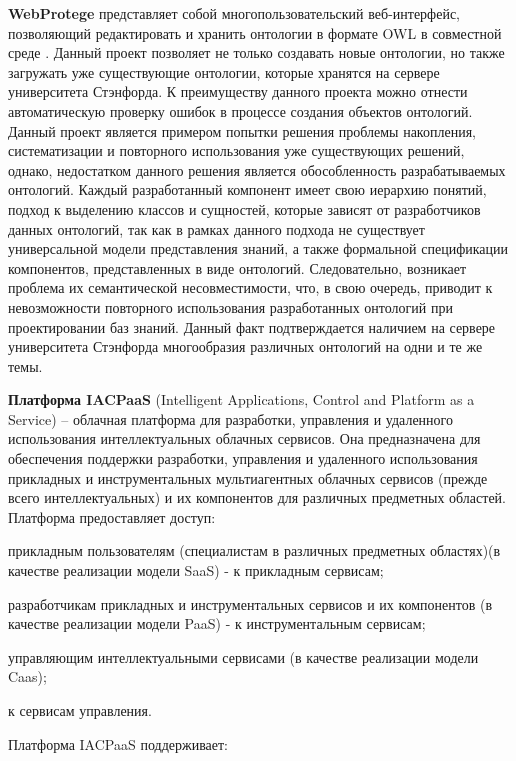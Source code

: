 \textbf{WebProtege} представляет собой многопользовательский веб-интерфейс, позволяющий редактировать и хранить онтологии в формате OWL в совместной среде . Данный проект позволяет не только создавать новые онтологии, но также загружать уже существующие онтологии, которые хранятся на сервере университета Стэнфорда. К преимуществу данного проекта можно отнести автоматическую проверку ошибок в процессе создания объектов онтологий. Данный проект является примером попытки решения проблемы накопления, систематизации и повторного использования уже существующих решений, однако, недостатком данного решения является обособленность разрабатываемых онтологий. Каждый разработанный компонент имеет свою иерархию понятий, подход к выделению классов и сущностей, которые зависят от разработчиков данных онтологий, так как в рамках данного подхода не существует универсальной модели представления знаний, а также формальной спецификации компонентов, представленных в виде онтологий. Следовательно, возникает проблема их семантической несовместимости, что, в свою очередь, приводит к невозможности повторного использования разработанных онтологий при проектировании баз знаний. Данный факт подтверждается наличием на сервере университета Стэнфорда многообразия различных онтологий на одни и те же темы.

\textbf{Платформа IACPaaS} (Intelligent Applications, Control and Platform as a Service) – облачная платформа для разработки, управления и удаленного использования интеллектуальных облачных сервисов. Она предназначена для обеспечения поддержки разработки, управления и удаленного использования прикладных и инструментальных мультиагентных облачных сервисов (прежде всего интеллектуальных) и их компонентов для различных предметных областей. Платформа предоставляет доступ:
\begin{textitemize}
	\item прикладным пользователям (специалистам в различных предметных областях)(в качестве реализации модели SaaS) - к прикладным сервисам;
	\item разработчикам прикладных и инструментальных сервисов и их компонентов (в качестве реализации модели PaaS) - к инструментальным сервисам;
	\item управляющим интеллектуальными сервисами (в качестве реализации модели Caas);
	\item к сервисам управления.
\end{textitemize}

Платформа IACPaaS поддерживает:


